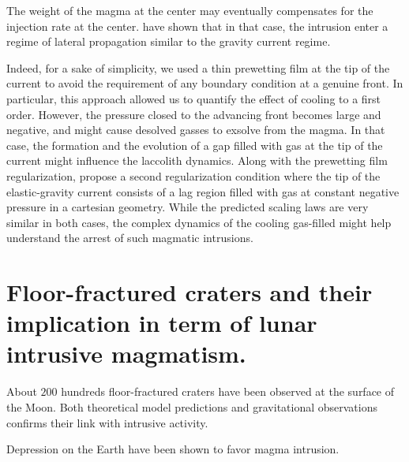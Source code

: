 The weight of  the magma at the center may  eventually compensates for
the injection  rate at  the center. \citet{Michaut:2011kg}  have shown
that in that case, the intrusion enter a regime of lateral propagation
similar to the gravity current regime.



Indeed, for  a sake of simplicity,  we used a thin  prewetting film at
the  tip of  the  current to  avoid the  requirement  of any  boundary
condition at a genuine front.  In particular, this approach allowed us
to quantify  the effect  of cooling  to a  first order.   However, the
pressure closed to the advancing front becomes large and negative, and
might cause desolved gasses to exsolve  from the magma.  In that case,
the formation and the evolution of a gap filled with gas at the tip of
the current  might influence the  laccolith dynamics.  Along  with the
prewetting film  regularization, \citet{Anonymous:QWXp_4JV}  propose a
second regularization  condition where the tip  of the elastic-gravity
current consists of a lag region  filled with gas at constant negative
pressure in a cartesian geometry. While the predicted scaling laws are
very  similar in  both  cases,  the complex  dynamics  of the  cooling
gas-filled  might   help  understand  the  arrest   of  such  magmatic
intrusions.



\section*{Floor-fractured  craters and  their implication  in term  of
  lunar intrusive magmatism.}

About $200$ hundreds floor-fractured craters have been observed at the
surface  of   the  Moon.   Both  theoretical   model  predictions  and
gravitational   observations  confirms   their  link   with  intrusive
activity. 

Depression on the Earth have been shown to favor magma intrusion. 


